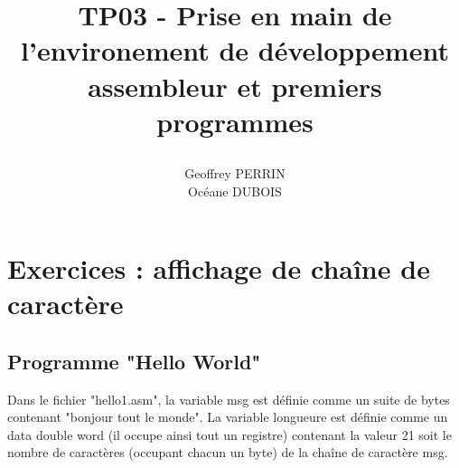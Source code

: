 \documentclass[11pt]{report}
\title{\textbf{TP03 - Prise en main de l'environement de développement assembleur et premiers programmes }
\author{Geoffrey PERRIN \\ Océane DUBOIS\\}
\date{}}
\begin{document}
\maketitle

\newpage

\section{Exercices : affichage de chaîne de caractère}

\subsection{Programme "Hello World"}

Dans le fichier "hello1.asm", la variable msg est définie comme un suite de bytes contenant "bonjour tout le monde".
La variable longueure est définie comme un data double word (il occupe ainsi tout un registre) contenant la valeur 21 soit le nombre de caractères (occupant chacun un byte) de la chaîne de caractère msg.
\end{document}
